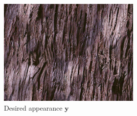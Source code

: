 \begin{figure}[]
    \begin{subfigure}{\textwidth}
        \centering
        \begin{subfigure}{0.2\textwidth}
            \centering
            \includegraphics[width=\textwidth]{images/04-experiment02/carpet/wood/target.jpg}
            \caption*{Desired appearance \(\bm{y}\)}
        \end{subfigure}
        \hfill
        \begin{subfigure}{0.78\textwidth}
            \centering
            \begin{subfigure}{0.32\textwidth}
                \centering
\end{subfigure}
\end{subfigure}
\end{subfigure}
\end{figure}
